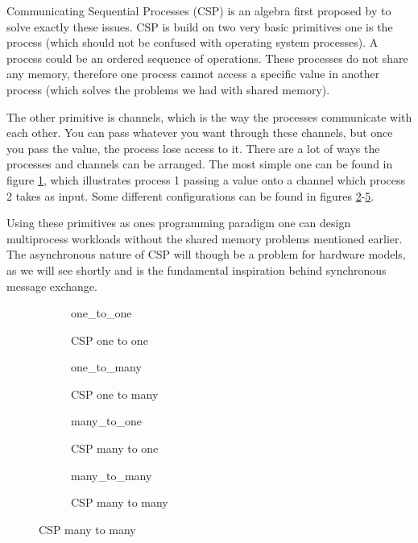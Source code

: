     Communicating Sequential Processes (CSP) is an algebra first proposed by \citet{HoareC1978Csp} to solve exactly these issues.
    CSP is build on two very basic primitives one is the process (which should not be confused with operating system processes). A process could be an ordered sequence of operations. These processes do not share any memory, therefore one process cannot access a specific value in another process (which solves the problems we had with shared memory).
    
    The other primitive is channels, which is the way the processes communicate with each other. You can pass whatever you want through these channels, but once you pass the value, the process lose access to it. There are a lot of ways the processes and channels can be arranged. The most simple one can be found in figure \ref{fig:one_to_one}, which illustrates process 1 passing a value onto a channel which process 2 takes as input. Some different configurations can be found in figures  \ref{fig:one_to_many}-\ref{fig:many_to_many}. 
    
    Using these primitives as ones programming paradigm one can design multiprocess workloads without the shared memory problems mentioned earlier. The asynchronous nature of CSP will though be a problem for hardware models, as we will see shortly and is the fundamental inspiration behind synchronous message exchange. 

    \begin{figure}[h!]
        \hspace*{-1.25cm}
        \begin{subfigure}[t]{0.5\textwidth}
            \centering
            {one_to_one}
            \caption{CSP one to one}
            \label{fig:one_to_one}
        \end{subfigure}%
        \hspace*{1cm}
        \begin{subfigure}[t]{0.5\textwidth}
            \centering
            {one_to_many}
            \caption{CSP one to many}
            \label{fig:one_to_many}
        \end{subfigure}
        \vspace*{2cm}
        
        \hspace*{-1cm}
        \begin{subfigure}[b]{0.5\textwidth}
            \centering
            {many_to_one}
            \caption{CSP many to one}
            \label{fig:many_to_one}
        \end{subfigure}%
        \hspace*{1cm}
        \begin{subfigure}[b]{0.5\textwidth}
            \centering
            {many_to_many}
            \caption{CSP many to many}
            \label{fig:many_to_many}
        \end{subfigure}%
    \end{figure}
    
